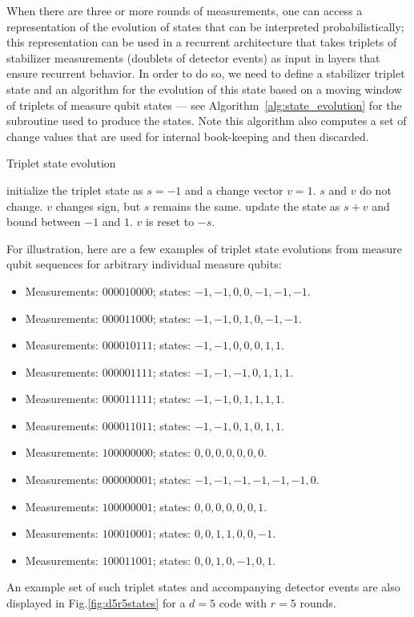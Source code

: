 When there are three or more rounds of measurements, one can access a representation of the evolution of states that can be interpreted probabilistically; this representation can be used in a recurrent architecture that takes triplets of stabilizer measurements (doublets of detector events) as input in layers that ensure recurrent behavior. 
In order to do so, we need to define a stabilizer triplet state and an algorithm for the evolution of this state based on a moving window of triplets of measure qubit states --- see Algorithm~\ref{alg:state_evolution} for the subroutine used to produce the states. Note this algorithm also computes a set of change values that are used for internal book-keeping and then discarded.

\begin{algorithm}
\caption{Triplet state evolution}
\begin{algorithmic}[1]
      \State initialize the triplet state as $s=-1$ and a change vector $v=1$.
    \EndIf
      \State $s$ and $v$ do not change.
    \Else
        \State $v$ changes sign, but $s$ remains the same.
      \Else
        \State update the state as $s+v$ and bound between $-1$ and $1$.
      \EndIf
    \EndIf
      \State $v$ is reset to $-s$.
    \EndIf
  \EndFor
\EndFor
\end{algorithmic}
\label{alg:state_evolution}
\end{algorithm}

For illustration, here are a few examples of triplet state evolutions from measure qubit sequences for arbitrary individual measure qubits:
\begin{itemize}
\item Measurements: $000010000$; states: $-1,-1,0,0,-1,-1,-1$.
\item Measurements: $000011000$; states: $-1,-1,0,1,0,-1,-1$.
\item Measurements: $000010111$; states: $-1,-1,0,0,0,1,1$.
\item Measurements: $000001111$; states: $-1,-1,-1,0,1,1,1$.
\item Measurements: $000011111$; states: $-1,-1,0,1,1,1,1$.
\item Measurements: $000011011$; states: $-1,-1,0,1,0,1,1$.
\item Measurements: $100000000$; states: $0,0,0,0,0,0,0$.
\item Measurements: $000000001$; states: $-1,-1,-1,-1,-1,-1,0$.
\item Measurements: $100000001$; states: $0,0,0,0,0,0,1$.
\item Measurements: $100010001$; states: $0,0,1,1,0,0,-1$.
\item Measurements: $100011001$; states: $0,0,1,0,-1,0,1$.
\end{itemize}
An example set of such triplet states and accompanying detector events are also displayed in Fig.\ref{fig:d5r5states} for a $d=5$ code with $r=5$ rounds.

